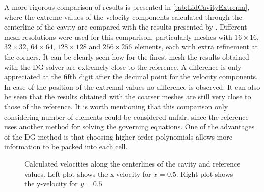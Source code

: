 A more rigorous comparison of results is presented in \cref{tab:LidCavityExtrema}, where the extreme values of the velocity components calculated through the centerline of the cavity are compared with the results presented by \textcite{botellaBenchmarkSpectralResults1998}. Different mesh resolutions were used for this comparison, particularly meshes with $16\times16$, $32\times32$, $64\times64$, $128\times128$ and $256\times256$ elements, each with extra refinement at the corners. It can be clearly seen how for the finest mesh the results obtained with the DG-solver are extremely close to the reference. A difference is only appreciated at the fifth digit after the decimal point for the velocity components. In case of the position of the extremal values no difference is observed. It can also be seen that the results obtained with the coarser meshes are still very close to those of the reference. It is worth mentioning that this comparison only considering number of elements could be considered unfair, since the reference uses another method for solving the governing equations. One of the advantages of the DG method is that choosing higher-order polynomials allows more information to be packed into each cell. %

\begin{figure}[tb]
	\caption{Calculated velocities along the centerlines of the cavity and reference values. Left plot shows the x-velocity for $x = 0.5$. Right plot shows the y-velocity for $y = 0.5$  }
	\label{fig:LidVelocities}
\end{figure}


